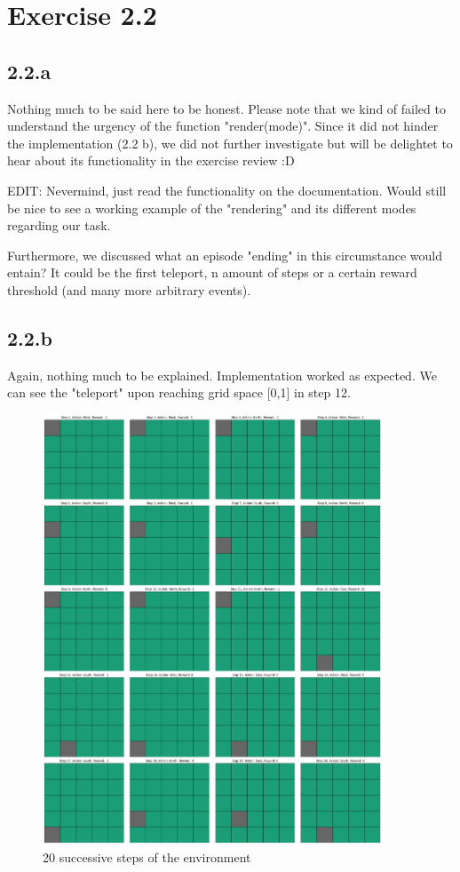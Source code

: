 \documentclass{article} %
\begin{document}
	
	\section{Exercise 2.2}
	\subsection{2.2.a}
	Nothing much to be said here to be honest. Please note that we kind of failed to understand the urgency of the function "render(mode)". Since it did not hinder the implementation (2.2 b), we did not further investigate but will be delightet to hear about its functionality in the exercise review :D 
	
	EDIT: Nevermind, just read the functionality on the documentation. Would still be nice to see a working example of the "rendering" and its different modes regarding our task.
	
	Furthermore, we discussed what an episode "ending" in this circumstance would entain? It could be the first teleport, n amount of steps or a certain reward threshold (and many more arbitrary events).
	
	\subsection{2.2.b}
	Again, nothing much to be explained. Implementation worked as expected. We can see the "teleport" upon reaching grid space [0,1] in step 12. 
	
	\begin{figure}[h!]
		\centering
		\includegraphics[width=0.9\textwidth]{images/20_steps.png}
		\caption{20 successive steps of the environment}
		\label{fig:1.1.a.1}
	\end{figure}
	
	
\end{document}
